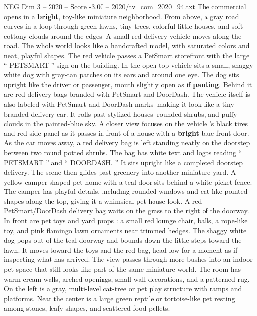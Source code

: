 \begin{textsample}{NEG Dim 3 – 2020 – Score -3.00 – 2020/tv\_com\_2020\_94.txt}  \label{ex:f3_neg_029}
The commercial opens in a \textbf{bright}, toy-like miniature neighborhood.
From above, a gray road curves in a loop through green lawns, tiny trees, colorful little houses, and soft cottony clouds around the edges.
A small red delivery vehicle moves along the road.
The whole world looks like a handcrafted model, with saturated colors and neat, playful shapes.
The red vehicle passes a PetSmart storefront with the large “ PETSMART ” sign on the building.
In the open-top vehicle sits a small, shaggy white dog with gray-tan patches on its ears and around one eye.
The dog sits upright like the driver or passenger, mouth slightly open as if \textbf{panting}.
Behind it are red delivery bags branded with PetSmart and DoorDash.
The vehicle itself is also labeled with PetSmart and DoorDash marks, making it look like a tiny branded delivery car.
It rolls past stylized houses, rounded shrubs, and puffy clouds in the painted-blue sky.
A closer view focuses on the vehicle ’s black tires and red side panel as it passes in front of a house with a \textbf{bright} blue front door.
As the car moves away, a red delivery bag is left standing neatly on the doorstep between two round potted shrubs.
The bag has white text and logos reading “ PETSMART ” and “ DOORDASH. ” It sits upright like a completed doorstep delivery.
The scene then glides past greenery into another miniature yard.
A yellow camper-shaped pet home with a teal door sits behind a white picket fence.
The camper has playful details, including rounded windows and cat-like pointed shapes along the top, giving it a whimsical pet-house look.
A red PetSmart/DoorDash delivery bag waits on the grass to the right of the doorway.
In front are pet toys and yard props : a small red lounge chair, balls, a rope-like toy, and pink flamingo lawn ornaments near trimmed hedges.
The shaggy white dog pops out of the teal doorway and bounds down the little steps toward the lawn.
It moves toward the toys and the red bag, head low for a moment as if inspecting what has arrived.
The view passes through more bushes into an indoor pet space that still looks like part of the same miniature world.
The room has warm cream walls, arched openings, small wall decorations, and a patterned rug.
On the left is a gray, multi-level cat-tree or pet play structure with ramps and platforms.
Near the center is a large green reptile or tortoise-like pet resting among stones, leafy shapes, and scattered food pellets.

\end{textsample}
